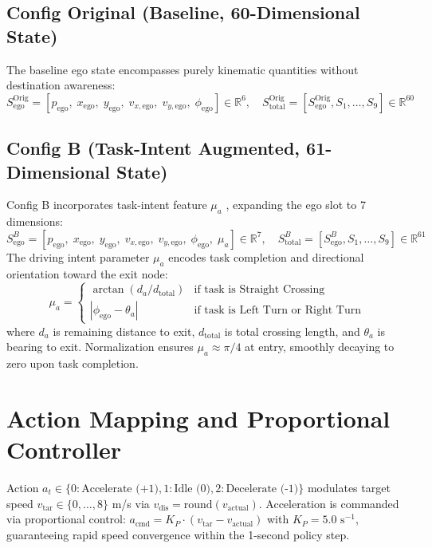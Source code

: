 \subsection{Config Original (Baseline, 60-Dimensional State)}
The baseline ego state encompasses purely kinematic quantities without destination awareness:
\begin{equation}
    S_{\text{ego}}^{\text{Orig}} = [p_{\text{ego}}, \; x_{\text{ego}}, \; y_{\text{ego}}, \; v_{x,\text{ego}}, \; v_{y,\text{ego}}, \; \phi_{\text{ego}}] \in \mathbb{R}^6, \quad S_{\text{total}}^{\text{Orig}} = [S_{\text{ego}}^{\text{Orig}}, S_1, \dots, S_9] \in \mathbb{R}^{60}
\end{equation}

\subsection{Config B (Task-Intent Augmented, 61-Dimensional State)}
Config B incorporates task-intent feature $\mu_a$ \cite{xiao2024decision}, expanding the ego slot to 7 dimensions:
\begin{equation}
    S_{\text{ego}}^{B} = [p_{\text{ego}}, \; x_{\text{ego}}, \; y_{\text{ego}}, \; v_{x,\text{ego}}, \; v_{y,\text{ego}}, \; \phi_{\text{ego}}, \; \mu_a] \in \mathbb{R}^7, \quad S_{\text{total}}^{B} = [S_{\text{ego}}^{B}, S_1, \dots, S_9] \in \mathbb{R}^{61}
\end{equation}
The driving intent parameter $\mu_a$ encodes task completion and directional orientation toward the exit node:
\begin{equation}
    \mu_a = \begin{cases}
        \arctan\left(d_a / d_{\text{total}}\right) & \text{if task is Straight Crossing} \\
        |\phi_{\text{ego}} - \theta_a| & \text{if task is Left Turn or Right Turn}
    \end{cases}
    \label{eq:mu_a}
\end{equation}
where $d_a$ is remaining distance to exit, $d_{\text{total}}$ is total crossing length, and $\theta_a$ is bearing to exit. Normalization ensures $\mu_a \approx \pi/4$ at entry, smoothly decaying to zero upon task completion.

\vspace{-0.2cm}
\section{Action Mapping and Proportional Controller}
Action $a_t \in \{0: \text{Accelerate (+1)}, 1: \text{Idle (0)}, 2: \text{Decelerate (-1)}\}$ modulates target speed $v_{\text{tar}} \in \{0, \dots, 8\}$ m/s via $v_{\text{dis}} = \text{round}(v_{\text{actual}})$. Acceleration is commanded via proportional control: $a_{\text{cmd}} = K_P \cdot (v_{\text{tar}} - v_{\text{actual}})$ with $K_P = 5.0\text{ s}^{-1}$, guaranteeing rapid speed convergence within the 1-second policy step.

